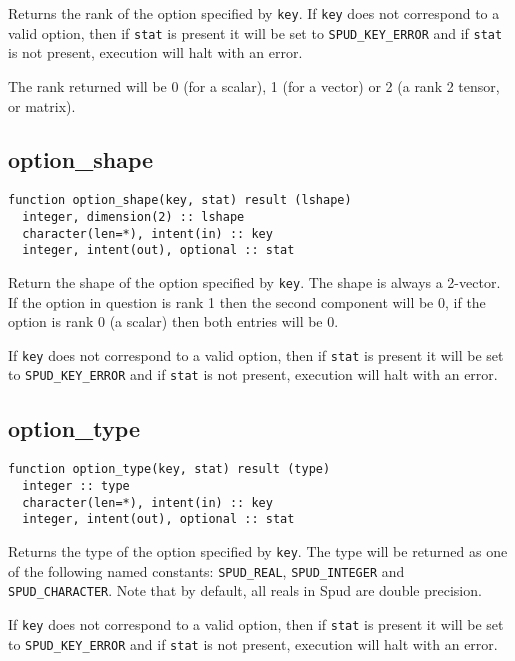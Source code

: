 \documentclass[a4paper, 11pt]{book}
\begin{document}
Returns the rank of the option specified by \lstinline+key+. If
\lstinline+key+ does not correspond to a valid option, then if
\lstinline+stat+ is present it will be set to \lstinline+SPUD_KEY_ERROR+ and
if \lstinline+stat+ is not present, execution will halt with an error.

The rank returned will be 0 (for a scalar), 1 (for a vector) or 2 (a rank 2
tensor, or matrix). 

\subsection{option\_shape}

\begin{lstlisting}
function option_shape(key, stat) result (lshape)
  integer, dimension(2) :: lshape
  character(len=*), intent(in) :: key
  integer, intent(out), optional :: stat
\end{lstlisting}

Return the shape of the option specified by \lstinline+key+. The shape is
always a 2-vector. If the option in question is rank 1 then the second
component will be 0, if the option is rank 0 (a scalar) then both entries
will be 0.

 If \lstinline+key+ does not correspond to a valid option, then if
 \lstinline+stat+ is present it will be set to \lstinline+SPUD_KEY_ERROR+ and
 if \lstinline+stat+ is not present, execution will halt with an error.

\subsection{option\_type}\label{sec:option_type}

\begin{lstlisting}
function option_type(key, stat) result (type)
  integer :: type
  character(len=*), intent(in) :: key
  integer, intent(out), optional :: stat
\end{lstlisting}

Returns the type of the option specified by \lstinline+key+. The type will
be returned as one of the following named constants: 
\lstinline+SPUD_REAL+, \lstinline+SPUD_INTEGER+ and
\lstinline+SPUD_CHARACTER+. Note that by default, all reals in Spud are
double precision.

If \lstinline+key+ does not correspond to a valid option, then if
\lstinline+stat+ is present it will be set to \lstinline+SPUD_KEY_ERROR+ and
if \lstinline+stat+ is not present, execution will halt with an error.
\end{document}
